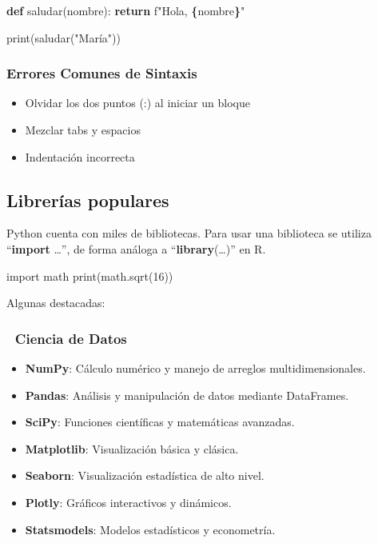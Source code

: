 \documentclass[
]{book}
\newenvironment{Shaded}{\begin{snugshade}}{\end{snugshade}}
\newcommand{\BuiltInTok}[1]{#1}
\newcommand{\ControlFlowTok}[1]{\textcolor[rgb]{0.13,0.29,0.53}{\textbf{#1}}}
\newcommand{\DecValTok}[1]{\textcolor[rgb]{0.00,0.00,0.81}{#1}}
\newcommand{\ImportTok}[1]{#1}
\newcommand{\KeywordTok}[1]{\textcolor[rgb]{0.13,0.29,0.53}{\textbf{#1}}}
\newcommand{\NormalTok}[1]{#1}
\newcommand{\SpecialCharTok}[1]{\textcolor[rgb]{0.81,0.36,0.00}{\textbf{#1}}}
\newcommand{\SpecialStringTok}[1]{\textcolor[rgb]{0.31,0.60,0.02}{#1}}
\newcommand{\StringTok}[1]{\textcolor[rgb]{0.31,0.60,0.02}{#1}}
\providecommand{\tightlist}{%
  \setlength{\itemsep}{0pt}\setlength{\parskip}{0pt}}
\theoremstyle{break}
\theoremstyle{nonumberplain}
\begin{document}
\begin{Shaded}
\begin{Highlighting}[]
\KeywordTok{def}\NormalTok{ saludar(nombre):}
    \ControlFlowTok{return} \SpecialStringTok{f"Hola, }\SpecialCharTok{\{}\NormalTok{nombre}\SpecialCharTok{\}}\SpecialStringTok{"}

\BuiltInTok{print}\NormalTok{(saludar(}\StringTok{"María"}\NormalTok{))}
\end{Highlighting}
\end{Shaded}

\subsubsection{Errores Comunes de Sintaxis}\label{errores-comunes-de-sintaxis}

\begin{itemize}
\tightlist
\item
  Olvidar los dos puntos (:) al iniciar un bloque
\item
  Mezclar tabs y espacios
\item
  Indentación incorrecta
\end{itemize}

\subsection{Librerías populares}\label{libreruxedas-populares}

Python cuenta con miles de bibliotecas.
Para usar una biblioteca se utiliza ``\textbf{import} \ldots{}'',
de forma análoga a ``\textbf{library}(\ldots)'' en R.

\begin{Shaded}
\begin{Highlighting}[]
\ImportTok{import}\NormalTok{ math}
\BuiltInTok{print}\NormalTok{(math.sqrt(}\DecValTok{16}\NormalTok{))}
\end{Highlighting}
\end{Shaded}

Algunas destacadas:

\subsubsection{🔢 Ciencia de Datos}\label{ciencia-de-datos}

\begin{itemize}
\tightlist
\item
  \textbf{NumPy}: Cálculo numérico y manejo de arreglos multidimensionales.
\item
  \textbf{Pandas}: Análisis y manipulación de datos mediante DataFrames.
\item
  \textbf{SciPy}: Funciones científicas y matemáticas avanzadas.
\item
  \textbf{Matplotlib}: Visualización básica y clásica.
\item
  \textbf{Seaborn}: Visualización estadística de alto nivel.
\item
  \textbf{Plotly}: Gráficos interactivos y dinámicos.
\item
  \textbf{Statsmodels}: Modelos estadísticos y econometría.
\end{itemize}
\end{document}
